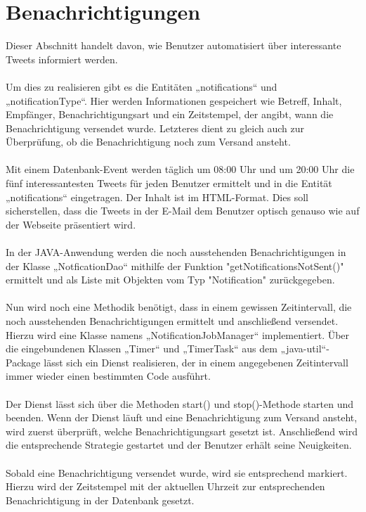\section{Benachrichtigungen}

Dieser Abschnitt handelt davon, wie Benutzer automatisiert über interessante Tweets informiert werden.
\\\\
Um dies zu realisieren gibt es die Entitäten „notifications“ und „notificationType“. Hier werden Informationen gespeichert wie Betreff, Inhalt, Empfänger, Benachrichtigungsart und ein Zeitstempel, der angibt, wann die Benachrichtigung versendet wurde. Letzteres dient zu gleich auch zur Überprüfung, ob die Benachrichtigung noch zum Versand ansteht.
\\\\
Mit einem Datenbank-Event werden täglich um 08:00 Uhr und um 20:00 Uhr die fünf interessantesten Tweets für jeden Benutzer ermittelt und in die Entität „notifications“ eingetragen. Der Inhalt ist im \acs{HTML}-Format. Dies soll sicherstellen, dass die Tweets in der E-Mail dem Benutzer optisch genauso wie auf der Webseite präsentiert wird.
\\\\
In der JAVA-Anwendung werden die noch ausstehenden Benachrichtigungen in der Klasse „NotficationDao“ mithilfe der Funktion "getNotificationsNotSent()" ermittelt und als Liste mit Objekten vom Typ "Notification" zurückgegeben.
\\\\
Nun wird noch eine Methodik benötigt, dass in einem gewissen Zeitintervall, die noch ausstehenden Benachrichtigungen ermittelt und anschließend versendet. Hierzu wird eine Klasse namens „NotificationJobManager“ implementiert. Über die eingebundenen Klassen „Timer“ und „TimerTask“ aus dem „java-util“-Package lässt sich ein Dienst realisieren, der in einem angegebenen Zeitintervall immer wieder einen bestimmten Code ausführt.
\\\\
Der Dienst lässt sich über die Methoden start() und stop()-Methode starten und beenden. Wenn der Dienst läuft und eine Benachrichtigung zum Versand ansteht, wird zuerst überprüft, welche Benachrichtigungsart gesetzt ist. Anschließend wird die entsprechende Strategie gestartet und der Benutzer erhält seine Neuigkeiten.
\\\\
Sobald eine Benachrichtigung versendet wurde, wird sie entsprechend markiert. Hierzu wird der Zeitstempel mit der aktuellen Uhrzeit zur entsprechenden Benachrichtigung in der Datenbank gesetzt.

